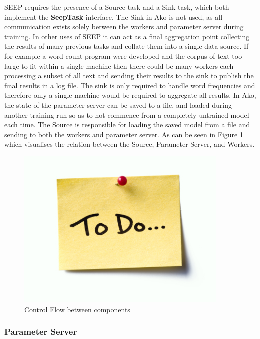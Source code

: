 \documentclass[12pt]{article}
\begin{document}
SEEP requires the presence of a Source task and a Sink task, which both implement the \textbf{SeepTask} interface. The Sink in Ako is not used, as all communication exists solely between the workers and parameter server during training. In other uses of SEEP it can act as a final aggregation point collecting the results of many previous tasks and collate them into a single data source. If for example a word count program were developed and the corpus of text too large to fit within a single machine then there could be many workers each processing a subset of all text and sending their results to the sink to publish the final results in a log file. The sink is only required to handle word frequencies and therefore only a single machine would be required to aggregate all results.
\newline
\newline
In Ako, the state of the parameter server can be saved to a file, and loaded during another training run so as to not commence from a completely untrained model each time. The Source is responsible for loading the saved model from a file and sending to both the workers and parameter server. As can be seen in Figure \ref{ControlFlow} which visualises the relation between the Source, Parameter Server, and Workers.

\begin{figure}[H]
  \centering
  \includegraphics[width=4in]{todo}
  \caption[]{Control Flow between components}
  \label{ControlFlow}
\end{figure}

\subsubsection{Parameter Server}
\end{document}
